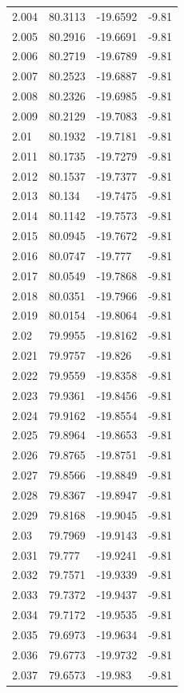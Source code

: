 \begin{tabular}{llll}
2.004 & 80.3113 & -19.6592 & -9.81 \\
2.005 & 80.2916 & -19.6691 & -9.81 \\
2.006 & 80.2719 & -19.6789 & -9.81 \\
2.007 & 80.2523 & -19.6887 & -9.81 \\
2.008 & 80.2326 & -19.6985 & -9.81 \\
2.009 & 80.2129 & -19.7083 & -9.81 \\
2.01 & 80.1932 & -19.7181 & -9.81 \\
2.011 & 80.1735 & -19.7279 & -9.81 \\
2.012 & 80.1537 & -19.7377 & -9.81 \\
2.013 & 80.134 & -19.7475 & -9.81 \\
2.014 & 80.1142 & -19.7573 & -9.81 \\
2.015 & 80.0945 & -19.7672 & -9.81 \\
2.016 & 80.0747 & -19.777 & -9.81 \\
2.017 & 80.0549 & -19.7868 & -9.81 \\
2.018 & 80.0351 & -19.7966 & -9.81 \\
2.019 & 80.0154 & -19.8064 & -9.81 \\
2.02 & 79.9955 & -19.8162 & -9.81 \\
2.021 & 79.9757 & -19.826 & -9.81 \\
2.022 & 79.9559 & -19.8358 & -9.81 \\
2.023 & 79.9361 & -19.8456 & -9.81 \\
2.024 & 79.9162 & -19.8554 & -9.81 \\
2.025 & 79.8964 & -19.8653 & -9.81 \\
2.026 & 79.8765 & -19.8751 & -9.81 \\
2.027 & 79.8566 & -19.8849 & -9.81 \\
2.028 & 79.8367 & -19.8947 & -9.81 \\
2.029 & 79.8168 & -19.9045 & -9.81 \\
2.03 & 79.7969 & -19.9143 & -9.81 \\
2.031 & 79.777 & -19.9241 & -9.81 \\
2.032 & 79.7571 & -19.9339 & -9.81 \\
2.033 & 79.7372 & -19.9437 & -9.81 \\
2.034 & 79.7172 & -19.9535 & -9.81 \\
2.035 & 79.6973 & -19.9634 & -9.81 \\
2.036 & 79.6773 & -19.9732 & -9.81 \\
2.037 & 79.6573 & -19.983 & -9.81 \\

\end{tabular}
